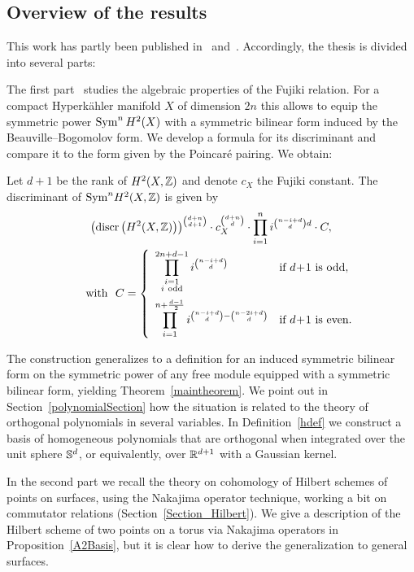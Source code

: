 \subsection{Overview of the results}
This work has partly been published in~\cite{Kapfer2} and~\cite{Kapfer}. 
Accordingly, the thesis is divided into several parts:

The first part~\cite{Kapfer} studies the algebraic properties of the Fujiki relation. For a compact Hyperk\"ahler manifold $X$ of dimension $2n$ this allows to equip the symmetric power $\Sym^nH^2(X)$ with a symmetric bilinear form induced by the Beauville--Bogomolov form. We develop a formula for its discriminant and compare it to the form given by the Poincar\'e pairing.
We obtain:
{
\renewcommand{\thetheorem}{\ref{FujikiDiscr}}
\begin{theorem}
Let $d+1$ be the rank of $H^2(X,\Z)$ and denote $c_X$ the Fujiki constant.
The discriminant of $\Sym^n\!H^2(X,\Z)$ is given by
\begin{gather*}
\left(\discr \left(H^2(X,\Z)\right)\right)^{\binom{d+n}{d+1}}\cdot c_X^{\binom{d+n}{d}} \cdot \prod_{i=1}^n i^{\binom{n-i+d}{d}d} 
\cdot C, \\
\qquad \text{with } \ 
C=
\left\{
 \begin{array}{*2{l}p{5cm}}
 \displaystyle\prod_{\substack{i=1 \\ i\ \text{odd}\\\ }}^{2n+d-1}i^{\binom{n-i+d}{d}} &\text{if }d\!+\! 1\text{ is odd}, \\
 \displaystyle\prod_{i=1}^{n+\frac{d-1}{2}} i^{\binom{n-i+d}{d} - \binom{n-2i+d}{d}} &\text{if }d\! +\! 1\text{ is even}.
\end{array}
\right.
\end{gather*}
\end{theorem}
\addtocounter{theorem}{-1}
}
The construction generalizes to a definition for an induced symmetric bilinear form on the symmetric power of any free module equipped with a symmetric bilinear form, yielding Theorem~\ref{maintheorem}. We point out in Section~\ref{polynomialSection} how the situation is related to the theory of orthogonal polynomials in several variables.
In Definition~\ref{hdef} we construct a basis of homogeneous polynomials that are orthogonal when integrated over the unit sphere $\S^d$, or equivalently, over $\R^{d+1}$ with a Gaussian kernel.

In the second part we recall the theory on cohomology of Hilbert schemes of points on surfaces, using the Nakajima operator technique, working a bit on commutator relations (Section~\ref{Section_Hilbert}).
We give a description of the Hilbert scheme of two points on a torus via Nakajima operators in Proposition~\ref{A2Basis}, but it is clear how to derive the generalization to general surfaces.

